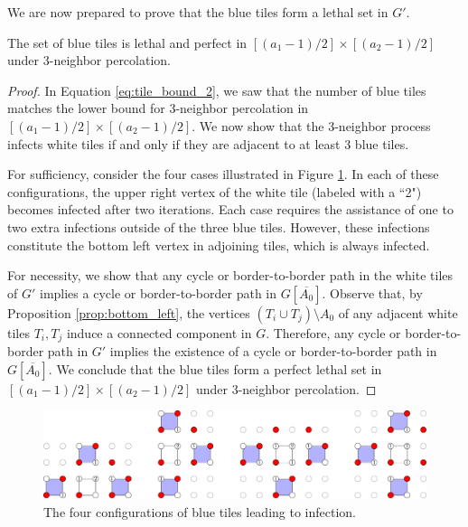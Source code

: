 We are now prepared to prove that the blue tiles form a lethal set in $G'$.

\begin{lem}
\label{lem:blue_lethal}
The set of blue tiles is lethal and perfect in $[(a_1-1)/2] \times [(a_2-1)/2]$ under 3-neighbor percolation.
\end{lem}

\begin{proof}
In Equation \ref{eq:tile_bound_2}, we saw that the number of blue tiles matches the lower bound for 3-neighbor percolation in $[(a_1-1)/2] \times [(a_2-1)/2]$. We now show that the 3-neighbor process infects white tiles if and only if they are adjacent to at least 3 blue tiles.

For sufficiency, consider the four cases illustrated in Figure \ref{fig:tile_infection}. In each of these configurations, the upper right vertex of the white tile (labeled with a ``2") becomes infected after two iterations. Each case requires the assistance of one to two extra infections outside of the three blue tiles. However, these infections constitute the bottom left vertex in adjoining tiles, which is always infected.

For necessity, we show that any cycle or border-to-border path in the white tiles of $G'$ implies a cycle or border-to-border path in $G[\overline{A_0}]$. Observe that, by Proposition \ref{prop:bottom_left}, the vertices $(T_i \cup T_{j}) \setminus A_0$ of any adjacent white tiles $T_i, T_j$ induce a connected component in $G$. Therefore, any cycle or border-to-border path in $G'$ implies the existence of a cycle or border-to-border path in $G[\overline{A_0}]$. We conclude that the blue tiles form a perfect lethal set in $[(a_1-1)/2] \times [(a_2-1)/2]$ under 3-neighbor percolation.
\end{proof}

\begin{figure}[]
\centering
\includegraphics[width=\textwidth]{figures/6/tile_infection.pdf}
\caption{The four configurations of blue tiles leading to infection.}
\label{fig:tile_infection}
\end{figure} 


